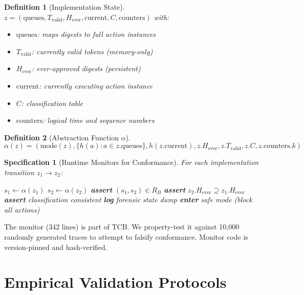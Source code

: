 \documentclass[12pt]{article}
\newtheorem{definition}{Definition}[section]
\newtheorem{spec}{Specification}[section]
\begin{document}
\begin{definition}[Implementation State]
$z = (\text{queues}, T_{\text{valid}}, H_{\text{ever}}, \text{current}, C, \text{counters})$ with:
\begin{itemize}
    \item $\text{queues}$: maps digests to full action instances
    \item $T_{\text{valid}}$: currently valid tokens (memory-only)
    \item $H_{\text{ever}}$: ever-approved digests (persistent)
    \item $\text{current}$: currently executing action instance
    \item $C$: classification table
    \item $\text{counters}$: logical time and sequence numbers
\end{itemize}
\end{definition}

\begin{definition}[Abstraction Function $\alpha$]
\[
\alpha(z) = (\text{mode}(z), \{h(a): a \in z.\text{queues}\}, 
             h(z.\text{current}), 
             z.H_{\text{ever}},
             z.T_{\text{valid}},
             z.C,
             z.\text{counters}.k)
\]
\end{definition}

\begin{spec}[Runtime Monitors for Conformance]
For each implementation transition $z_1 \to z_2$:
\begin{algorithmic}[1]
\STATE $s_1 \gets \alpha(z_1)$
\STATE $s_2 \gets \alpha(z_2)$
\STATE \textbf{assert} $(s_1, s_2) \in R_B$ 
\STATE \textbf{assert} $z_2.H_{\text{ever}} \supseteq z_1.H_{\text{ever}}$ 
\STATE \textbf{assert} classification consistent
    \STATE \textbf{log} forensic state dump
    \STATE \textbf{enter} safe mode (block all actions)
\ENDIF
\end{algorithmic}
\end{spec}

\begin{remark}
The monitor (342 lines) is part of TCB. We property-test it against 10,000 randomly generated traces to attempt to falsify conformance. Monitor code is version-pinned and hash-verified.
\end{remark}

\section{Empirical Validation Protocols}
\end{document}
